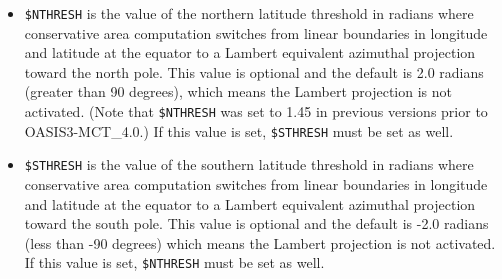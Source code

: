 \begin{itemize}
\begin{itemize}
      For {\tt CONSERV/SECOND}, 3 weights are needed; OASIS3-MCT will
      calculate these weights and corresponding addresses (if they are
      not already provided) but will not, at run time, calculate the
      two extra terms to which the second and third weights should be
      applied. These terms, respectively the gradient of the field
      with respect to the latitude ($\theta$) $\frac{\delta f}{\delta
        \theta}$ and the gradient of the field with respect to the
      longitude ($\phi$) $\frac{1}{cos \theta}\frac{\delta f}{\delta
        \phi}$ need to be calculated by the source code and transferred
      as extra arguments of the {\tt oasis\_put} as {\tt fld2} and {\tt fld3}
      respectively (see section \ref{prismput}). Note that {\tt CONSERV/SECOND} is
      not positive definite.
    \item {\tt \$NTHRESH} is the value of the northern latitude threshold in radians 
      where conservative area computation switches from linear boundaries in
      longitude and latitude at the equator to a Lambert equivalent azimuthal projection
      toward the north pole.  This value is optional and the default is 2.0 
      radians (greater than 90 degrees), which means the Lambert projection is 
      not activated. (Note that {\tt \$NTHRESH} was set to 1.45 in previous versions prior to OASIS3-MCT\_4.0.)  
      If this value is set, {\tt \$STHRESH} must be set as well.
    \item {\tt \$STHRESH}  is the value of the southern latitude threshold in radians 
      where conservative area computation switches from linear boundaries in
      longitude and latitude at the equator to a Lambert equivalent azimuthal projection
      toward the south pole.  This value is optional and the default is -2.0 
      radians (less than -90 degrees) which means the Lambert projection is 
      not activated.  If this value is set, {\tt \$NTHRESH} must be set as well.
    \end{itemize}

  \end{itemize}

